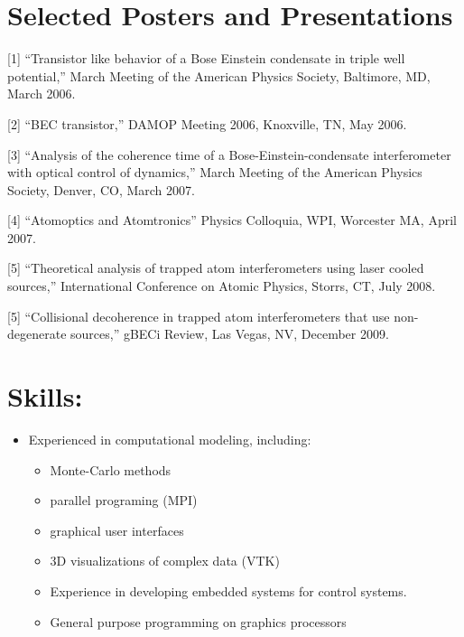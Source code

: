 \documentclass[overlapped,line,letterpaper]{res}
\begin{document}
\begin{resume}

\section{\bf Selected Posters and Presentations}

[1] ``Transistor like behavior of a Bose Einstein condensate in triple well potential,'' March Meeting of the American Physics Society, Baltimore, MD, March 2006.

[2] ``BEC transistor,'' DAMOP Meeting 2006, Knoxville, TN, May 2006.

[3] ``Analysis of the coherence time of a Bose-Einstein-condensate interferometer with optical control of dynamics,''
March Meeting of the American Physics Society, Denver, CO, March 2007.

[4] ``Atomoptics and Atomtronics'' Physics Colloquia, WPI, Worcester MA, April 2007.

[5] ``Theoretical analysis of trapped atom interferometers using laser cooled sources,'' International Conference on
Atomic Physics, Storrs, CT, July 2008.

[5] ``Collisional decoherence in trapped atom interferometers that use non-degenerate sources,'' gBECi Review, Las
Vegas, NV, December 2009.









\section{\bf Skills:} 

\begin{itemize}

\item Experienced in computational modeling, including:
\begin{itemize} 
\item Monte-Carlo methods
\item parallel programing (MPI)
\item graphical user interfaces
\item 3D visualizations of complex data (VTK)
\item Experience in developing embedded systems for control systems.  
\item General purpose programming on graphics processors
\end{itemize}


\end{itemize}
\end{resume}
\end{document}
